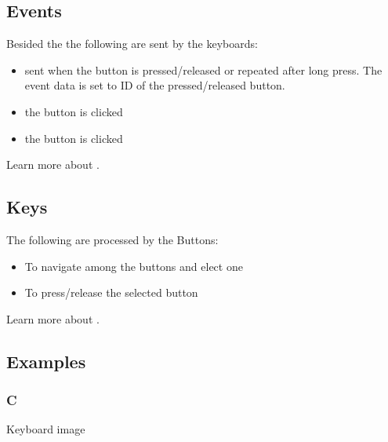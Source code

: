 \documentclass[letterpaper,10pt,english]{sphinxmanual}
\begin{document}
\subsection{Events}
\label{\detokenize{object-types/kb:events}}
Besided the  the following  are sent by the keyboards:
\begin{itemize}
\item {} 
 sent when the button is pressed/released or repeated after long press. The event data is set to ID of the pressed/released button.

\item {} 
 the  button is clicked

\item {} 
 the  button is clicked

\end{itemize}

Learn more about {\hyperref[\detokenize{overview/events::doc}]{}}.


\subsection{Keys}
\label{\detokenize{object-types/kb:keys}}
The following  are processed by the Buttons:
\begin{itemize}
\item {} 
 To navigate among the buttons and elect one

\item {} 
 To press/release the selected button

\end{itemize}

Learn more about {\hyperref[\detokenize{overview/indev::doc}]{}}.


\subsection{Examples}
\label{\detokenize{object-types/kb:examples}}

\subsubsection{C}
\label{\detokenize{object-types/kb:c}}
Keyboard image
\end{document}
